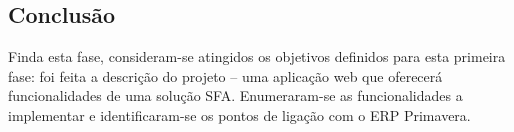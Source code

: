 \begin{titlepage}
\section{Conclusão}
\justify\normalsize
Finda esta fase, consideram-se atingidos os objetivos definidos para esta primeira fase: foi feita a descrição do projeto – uma aplicação web que oferecerá funcionalidades de uma solução SFA. Enumeraram-se as funcionalidades a implementar e identificaram-se os pontos de ligação com o ERP Primavera.

\end{titlepage}
